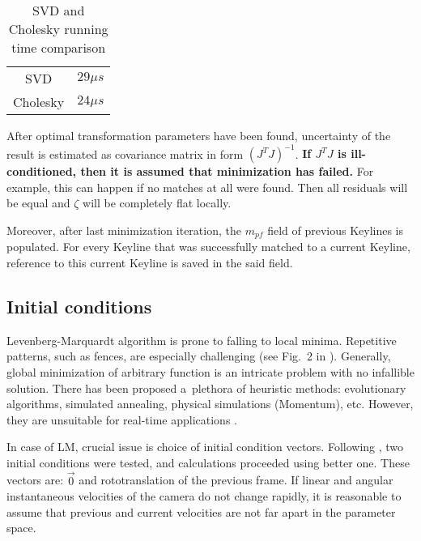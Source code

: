 \begin{table}[ht]
	\centering
	
	\begin{threeparttable}
		\caption{SVD and Cholesky running time comparison}
		\label{tab:chol}
		
		\begin{tabularx}{0.6\textwidth}{C{0.5} C{0.5}}
			\toprule
			 &  \\
			\midrule
			SVD & $29 \mu s$ \\
			Cholesky & $24 \mu s$ \\
			\bottomrule
		\end{tabularx}
		
	\end{threeparttable}
\end{table}


After optimal transformation parameters have been found, uncertainty of the result is estimated as covariance matrix in form $\left( J^T J \right) ^ {-1}$. \textbf{If $J^T J$ is ill-conditioned, then it is assumed that minimization has failed.} For example, this can happen if no matches at all were found. Then all residuals will be equal and $\zeta$ will be completely flat locally.

Moreover, after last minimization iteration, the $m_{pf}$ field of previous Keylines is populated. For every Keyline that was successfully matched to a current Keyline, reference to this current Keyline is saved in the said field.

\subsection{Initial conditions}

Levenberg-Marquardt algorithm is prone to falling to local minima. Repetitive patterns, such as fences, are especially challenging (see Fig.~2 in \cite{parra2008robust}). Generally, global minimization of arbitrary function is an intricate problem with no infallible solution. There has been proposed a~plethora of heuristic methods: evolutionary algorithms, simulated annealing, physical simulations (Momentum), etc. However, they are unsuitable for real-time applications \cite{szeliski}.

In case of LM, crucial issue is choice of initial condition vectors. Following \cite{jose2015realtime}, two initial conditions were tested, and calculations proceeded using better one. These vectors are: $\vec{0}$ and rototranslation of the previous frame. If linear and angular instantaneous velocities of the camera do not change rapidly, it is reasonable to assume that previous and current velocities are not far apart in the parameter space.

